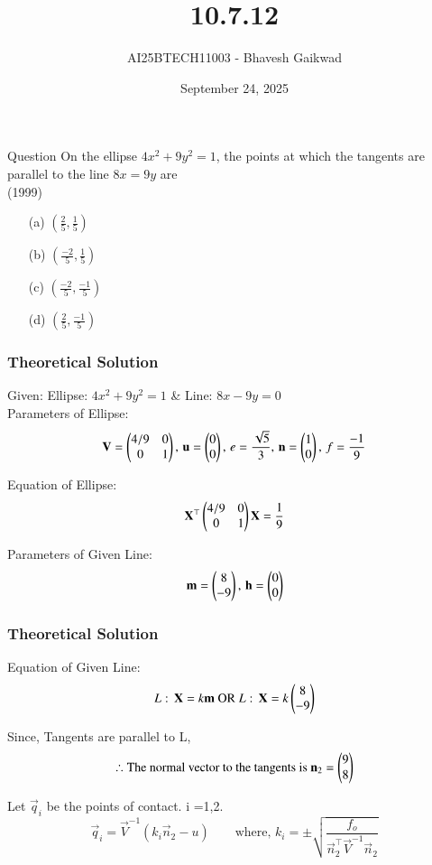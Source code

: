 \documentclass{beamer}
\title
{10.7.12}
\date{September 24, 2025}
\author 
{AI25BTECH11003 - Bhavesh Gaikwad}
\begin{document}
\frame{\titlepage}
\begin{frame}{Question}
On the ellipse $4x^2 + 9y^2 = 1$, the points at which the tangents are parallel to the line $8x = 9y$ are\\

\hfill{(1999)}

\begin{itemize}
    \item[(a)] $(\frac{2}{5}, \frac{1}{5})$
    \item[(b)] $(\frac{-2}{5},\frac{1}{5})$
    \item[(c)] $(\frac{-2}{5},\frac{-1}{5})$
    \item[(d)] $(\frac{2}{5},\frac{-1}{5})$
\end{itemize}
\end{frame}


\begin{frame}[fragile]
    \frametitle{Theoretical Solution}
Given: Ellipse: $4x^2 + 9y^2 = 1$ \& Line: $8x-9y=0$\\

Parameters of Ellipse:
\begin{equation}
\mathbf{V} = \begin{pmatrix}4/9 & 0 \\ 0 & 1\end{pmatrix}, \, \mathbf{u} = \begin{pmatrix}0 \\ 0\end{pmatrix}, \, e = \dfrac{\sqrt{5}}{3}, \, \mathbf{n} = \begin{pmatrix}1 \\ 0\end{pmatrix}, \, f = \frac{-1}{9}
\end{equation}

Equation of Ellipse:
\begin{equation}
    \mathbf{X}^\top \begin{pmatrix}4/9 & 0 \\ 0 & 1\end{pmatrix}\mathbf{X} = \frac{1}{9}
\end{equation}

Parameters of Given Line:
\begin{equation}
\mathbf{m} =  \begin{pmatrix}8 \\ -9\end{pmatrix}, \, \mathbf{h}=\begin{pmatrix}0 \\ 0\end{pmatrix}
\end{equation}
\end{frame}


\begin{frame}[fragile]
    \frametitle{Theoretical Solution}
Equation of Given Line:
\begin{equation}
     L: \, \mathbf{X} = k\mathbf{m} \text{  OR  } L: \, \mathbf{X} = k\begin{pmatrix}8 \\ -9\end{pmatrix}
\end{equation}

Since, Tangents are parallel to L,
\begin{equation}
    \therefore \text{The normal vector to the tangents is } \mathbf{n}_2 = \begin{pmatrix} 9 \\ 8\end{pmatrix}
\end{equation}

Let $\vec{q}_i$ be the points of contact. i =1,2.
\begin{equation}
    \vec{q}_i = \vec{V}^{-1}(k_i\vec{n}_2 - u) \qquad
    \text{where, } k_i = \pm \sqrt{\dfrac{f_o}{\vec{n}_2^\top \vec{V}^{-1} \vec{n}_2}}
\end{equation}
\end{frame}
\end{document}
